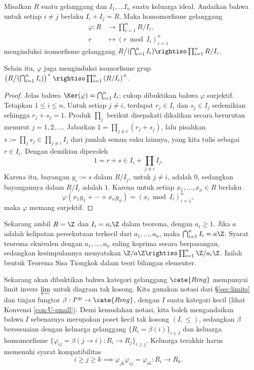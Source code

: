 \begin{theorem}\label{prop:CRT}
	Misalkan $R$ suatu gelanggang dan $I_1, \ldots I_n$ suatu keluarga ideal. Andaikan bahwa untuk setiap $i \neq j$ berlaku $I_i + I_j = R$. Maka homomorfisme gelanggang
	\begin{align*}
		\varphi: R & \longrightarrow \prod_{i=1}^n R/I_i, \\
		r & \longmapsto \left( r \bmod I_i \right)_{i=1}^n
	\end{align*}
	menginduksi isomorfisme gelanggang $R \big/ (\bigcap_{i=1}^n I_i) \rightiso \prod_{i=1}^n R/I_i$.
\end{theorem}
Selain itu, $\varphi$ juga menginduksi isomorfisme grup $\left( R \big/ (\bigcap_{i=1}^n I_i)\right)^\times \rightiso \prod_{i=1}^n \left(R/I_i\right)^\times$.
\begin{proof}
	Jelas bahwa $\Ker(\varphi) = \bigcap_{i=1}^n I_i$; cukup dibuktikan bahwa $\varphi$ surjektif. Tetapkan $1 \leq i \leq n$. Untuk setiap $j \neq i$, terdapat $r_j \in I_i$ dan $s_j \in I_j$ sedemikian sehingga $r_j + s_j = 1$. Produk $\prod_j$ berikut disepakati dikalikan secara berurutan menurut $j=1,2,\ldots$. Jabarkan $1 = \prod_{j \neq i} (r_j + s_j)$, lalu pisahkan $s := \prod_j s_j \in \prod_{j \neq i} I_j$ dari jumlah semua suku lainnya, yang kita tulis sebagai $r \in I_i$. Dengan demikian diperoleh
	\[ 1 = r + s \in I_i + \prod_{j \neq i} I_j. \]
	Karena itu, bayangan $y_i := s$ dalam $R/I_j$, untuk $j \neq i$, adalah $0$, sedangkan bayangannya dalam $R/I_i$ adalah $1$. Karena untuk setiap $x_1, \ldots, x_n \in R$ berlaku
	\[ \varphi(x_1 y_1 + \cdots + x_n y_n) = (x_i \bmod I_i)_{i=1}^n, \]
	maka $\varphi$ memang surjektif.
\end{proof}

Sekarang ambil $R=\Z$ dan $I_i = a_i \Z$ dalam teorema, dengan $a_i \geq 1$. Jika $a$ adalah kelipatan persekutuan terkecil dari $a_1, \ldots, a_n$, maka $\bigcap_{i=1}^n I_i = a\Z$. Syarat teorema ekuivalen dengan $a_1, \ldots, a_n$ saling koprima secara berpasangan, sedangkan kesimpulannya menyatakan $\Z/a\Z \rightiso \prod_{i=1}^n \Z/a_i\Z$. Inilah bentuk Teorema Sisa Tiongkok dalam teori bilangan elementer.

Sekarang akan dibuktikan bahwa kategori gelanggang $\cate{Ring}$  mempunyai limit invers $\varprojlim$ untuk diagram tak kosong. Kita gunakan notasi dari \S\ref{sec:limits} dan tinjau fungtor $\beta: I^\text{op} \to \cate{Ring}$, dengan $I$ suatu kategori kecil (lihat Konvensi \ref{con:U-small}). Demi kemudahan notasi, kita boleh mengandaikan bahwa $I$ sebenarnya merupakan poset kecil tak kosong $(I, \leq)$, sedangkan $\beta$ bersesuaian dengan keluarga gelanggang $\{R_i = \beta(i) \}_{i \in I}$ dan keluarga homomorfisme $\{\varphi_{ij} = \beta(j \to i): R_i \to R_j \}_{i \geq j}$. Keluarga terakhir harus memenuhi syarat kompatibilitas
\[ i \geq j \geq k \implies \varphi_{jk} \varphi_{ij} = \varphi_{ik}: R_i \to R_k. \]

